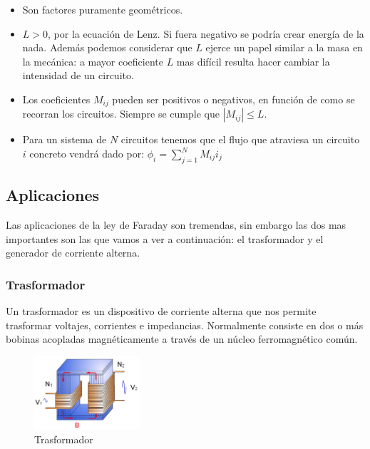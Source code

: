 \documentclass[12pt]{article}
\begin{document}
\begin{itemize}

\item Son factores puramente geométricos.

\item $L >0 $, por la ecuación de Lenz. Si fuera negativo se podría crear energía de la nada. Además podemos considerar que $L$ ejerce un papel similar a la masa en la mecánica: a mayor coeficiente $L$ mas difícil resulta hacer cambiar la intensidad de un circuito. 

\item Los coeficientes $M_{ij}$ pueden ser positivos o negativos, en función de como se recorran los circuitos. Siempre se cumple que $|M_{ij}| \leq L$. 

\item Para un sistema de $N$ circuitos tenemos que el flujo que atraviesa un circuito $i$ concreto vendrá dado por: $ \phi_i = \sum_{j=1}^N M_{ij} i_j $

\end{itemize}


\subsection{Aplicaciones}

Las aplicaciones de la ley de Faraday son tremendas, sin embargo las dos mas importantes son las que vamos a ver a continuación: el trasformador y el generador de corriente alterna.

\subsubsection{Trasformador}

Un trasformador es un dispositivo de corriente alterna que nos permite trasformar voltajes, corrientes e impedancias. Normalmente consiste en dos o más bobinas acopladas magnéticamente a través de un núcleo ferromagnético común.\\



\begin{figure}
    \centering
    \includegraphics[width=0.35\textwidth]{trasformador.jpg}
    \caption{Trasformador}
\end{figure}
\end{document}
